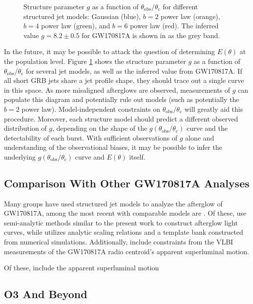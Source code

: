 \documentclass[twocolumn]{aastex62}
\newcommand{\gwbns}{GW170817A}
\newcommand{\thobs}{\ensuremath{\theta_{\mathrm{obs}}}}
\newcommand{\thC}{\ensuremath{\theta_{\mathrm{c}}}}
\begin{document}
\begin{figure}
	\caption{Structure parameter $g$ as a function of $\thobs/\thC$ for different structured jet models: Gaussian (blue), $b=2$ power law (orange), $b=4$ power law (green), and $b=6$ power law (red).  The inferred value $g = 8.2\pm0.5$ for \gwbns{} is shown in as the grey band. \label{fig:gPop}}
\end{figure}

In the future, it may be possible to attack the question of determining $E(\theta)$ at the population level.  Figure \ref{fig:gPop} shows the structure parameter $g$ as a function of $\thobs/\thC$ for several jet models, as well as the inferred value from \gwbns{}.  If all short GRB jets share a jet profile shape, they should trace out a single curve in this space.  As more misaligned afterglows are observed, measurements of $g$ can populate this diagram and potentially rule out models (such as potentially the $b=2$ power law).  Model-independent constraints on $\thobs/\thC$ will greatly aid this procedure.  Moreover, each structure model should predict a different observed distribution of $g$, depending on the shape of the $g(\thobs/\thC)$ curve and the detectability of each burst.  With sufficient observations of $g$ alone and understanding of the observational biases, it may be possible to infer the underlying $g(\thobs/\thC)$ curve and $E(\theta)$ itself.

\subsection{Comparison With Other \gwbns{} Analyses}


Many groups have used structured jet models to analyze the afterglow of \gwbns{}, among the most recent with comparable models are \citet{Hotokezaka:2018aa, Ghirlanda:2019aa, Lamb:2019aa, Wu:2018aa}.  Of these, \citet{Hotokezaka:2018aa, Ghirlanda:2019aa, Lamb:2019aa} use semi-analytic methods similar to the present work to construct afterglow light curves, while \citet{Wu:2018aa} utilizes analytic scaling relations and a template bank constructed from numerical simulations.  Additionally, \citet{Hotokezaka:2018aa, Ghirlanda:2019aa} include constraints from the VLBI measurements of the \gwbns{} radio centroid's apparent superluminal motion.

Of these, \citet{Mooley:2018ab, Hotokezaka:2018aa, Ghirlanda:2019aa} include the apparent superluminal motion

\subsection{O3 And Beyond}
\end{document}
